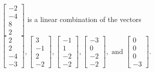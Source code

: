 \begin{exercise}
\begin{exerciseStatement}
  \end{exerciseStatement}
  \begin{exerciseAnswer}
   \(\left[\begin{array}{c}
-2 \\
-4 \\
8 \\
2
\end{array}\right]\) 
  	 is  
	a linear combination of the vectors \(\left[\begin{array}{c}
2 \\
2 \\
-4 \\
-3
\end{array}\right] , \left[\begin{array}{c}
3 \\
-1 \\
2 \\
-2
\end{array}\right] , \left[\begin{array}{c}
-1 \\
1 \\
-2 \\
-2
\end{array}\right] , \left[\begin{array}{c}
-3 \\
0 \\
-2 \\
-2
\end{array}\right] , \text{ and } \left[\begin{array}{c}
0 \\
0 \\
0 \\
-3
\end{array}\right]\).

	
  


  \end{exerciseAnswer}
\end{exercise}